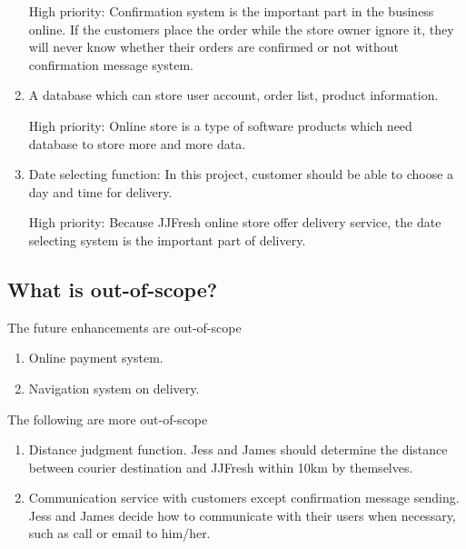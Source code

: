\documentclass{report}
\begin{document}
\begin{enumerate}
  High priority: Confirmation system is the important part in the business online. If the customers place the order while the store owner ignore it, they will never know whether their orders are confirmed or not without confirmation message system.
  
  \item A database which can store user account, order list, product information.
  
  High priority: Online store is a type of software products which need database to store more and more data.
  
  \item Date selecting function: In this project, customer should be able to choose a day and time for delivery.
  
  High priority: Because JJFresh online store offer delivery service, the date selecting system is the important part of delivery.
\end{enumerate}
\subsection{What is out-of-scope?}
The future enhancements are out-of-scope
\begin{enumerate}
  \item Online payment system.
  \item Navigation system on delivery.
\end{enumerate}
The following are more out-of-scope
\begin{enumerate}
  \item Distance judgment function. Jess and James should determine the distance between courier destination and JJFresh within 10km by themselves.
  \item Communication service with customers except confirmation message sending. Jess and James decide how to communicate with their users when necessary, such as call or email to him/her.
\end{enumerate}
\end{document}
